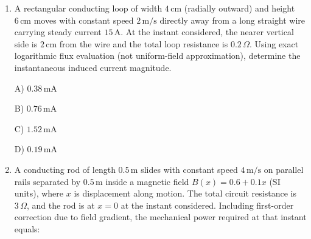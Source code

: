 \documentclass[12pt]{article}
\begin{document}
\begin{enumerate}[leftmargin=*]

\item A rectangular conducting loop of width \(4\,\text{cm}\) (radially outward) and height \(6\,\text{cm}\) moves with constant speed \(2\,\text{m/s}\) directly away from a long straight wire carrying steady current \(15\,\text{A}\). At the instant considered, the nearer vertical side is \(2\,\text{cm}\) from the wire and the total loop resistance is \(0.2\,\Omega\). Using exact logarithmic flux evaluation (not uniform-field approximation), determine the instantaneous induced current magnitude.  


A) \(0.38\,\text{mA}\)  

B) \(0.76\,\text{mA}\)  

C) \(1.52\,\text{mA}\)  

D) \(0.19\,\text{mA}\)  

\item A conducting rod of length \(0.5\,\text{m}\) slides with constant speed \(4\,\text{m/s}\) on parallel rails separated by \(0.5\,\text{m}\) inside a magnetic field \(B(x)=0.6+0.1x\) (SI units), where \(x\) is displacement along motion. The total circuit resistance is \(3\,\Omega\), and the rod is at \(x=0\) at the instant considered. Including first-order correction due to field gradient, the mechanical power required at that instant equals:  


\end{enumerate}
\end{document}
